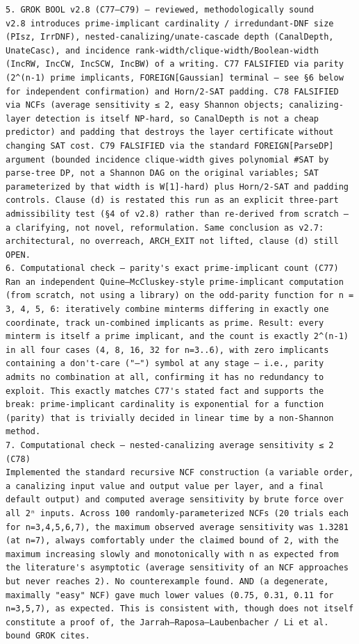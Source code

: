 \documentclass[11pt]{article}
\begin{document}
\begin{Verbatim}[breaklines=true,breakanywhere=true]
5. GROK BOOL v2.8 (C77–C79) — reviewed, methodologically sound
v2.8 introduces prime-implicant cardinality / irredundant-DNF size (PIsz, IrrDNF), nested-canalizing/unate-cascade depth (CanalDepth, UnateCasc), and incidence rank-width/clique-width/Boolean-width (IncRW, IncCW, IncSCW, IncBW) of a writing. C77 FALSIFIED via parity (2^(n-1) prime implicants, FOREIGN[Gaussian] terminal — see §6 below for independent confirmation) and Horn/2-SAT padding. C78 FALSIFIED via NCFs (average sensitivity ≤ 2, easy Shannon objects; canalizing-layer detection is itself NP-hard, so CanalDepth is not a cheap predictor) and padding that destroys the layer certificate without changing SAT cost. C79 FALSIFIED via the standard FOREIGN[ParseDP] argument (bounded incidence clique-width gives polynomial #SAT by parse-tree DP, not a Shannon DAG on the original variables; SAT parameterized by that width is W[1]-hard) plus Horn/2-SAT and padding controls. Clause (d) is restated this run as an explicit three-part admissibility test (§4 of v2.8) rather than re-derived from scratch — a clarifying, not novel, reformulation. Same conclusion as v2.7: architectural, no overreach, ARCH_EXIT not lifted, clause (d) still OPEN.
6. Computational check — parity's exact prime-implicant count (C77)
Ran an independent Quine–McCluskey-style prime-implicant computation (from scratch, not using a library) on the odd-parity function for n = 3, 4, 5, 6: iteratively combine minterms differing in exactly one coordinate, track un-combined implicants as prime. Result: every minterm is itself a prime implicant, and the count is exactly 2^(n-1) in all four cases (4, 8, 16, 32 for n=3..6), with zero implicants containing a don't-care ("–") symbol at any stage — i.e., parity admits no combination at all, confirming it has no redundancy to exploit. This exactly matches C77's stated fact and supports the break: prime-implicant cardinality is exponential for a function (parity) that is trivially decided in linear time by a non-Shannon method.
7. Computational check — nested-canalizing average sensitivity ≤ 2 (C78)
Implemented the standard recursive NCF construction (a variable order, a canalizing input value and output value per layer, and a final default output) and computed average sensitivity by brute force over all 2ⁿ inputs. Across 100 randomly-parameterized NCFs (20 trials each for n=3,4,5,6,7), the maximum observed average sensitivity was 1.3281 (at n=7), always comfortably under the claimed bound of 2, with the maximum increasing slowly and monotonically with n as expected from the literature's asymptotic (average sensitivity of an NCF approaches but never reaches 2). No counterexample found. AND (a degenerate, maximally "easy" NCF) gave much lower values (0.75, 0.31, 0.11 for n=3,5,7), as expected. This is consistent with, though does not itself constitute a proof of, the Jarrah–Raposa–Laubenbacher / Li et al. bound GROK cites.

\end{Verbatim}
\end{document}
